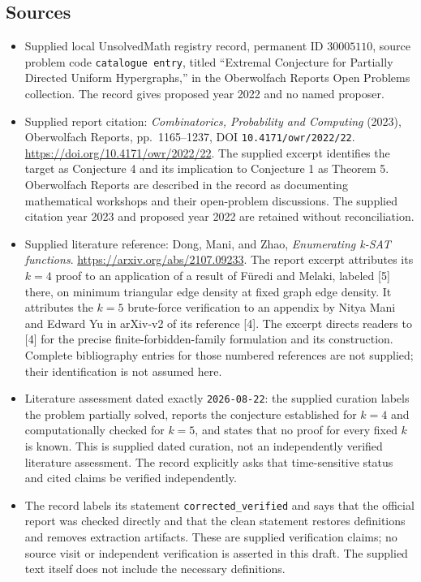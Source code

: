 \documentclass[11pt]{article}
\begin{document}
\subsection{Sources}
\begin{itemize}
\item Supplied local UnsolvedMath registry record, permanent ID \(30005110\), source problem code \texttt{catalogue entry}, titled ``Extremal Conjecture for Partially Directed Uniform Hypergraphs,'' in the Oberwolfach Reports Open Problems collection. The record gives proposed year 2022 and no named proposer.
\item Supplied report citation: \emph{Combinatorics, Probability and Computing} (2023), Oberwolfach Reports, pp.~1165--1237, DOI \texttt{10.4171/owr/2022/22}. \url{https://doi.org/10.4171/owr/2022/22}. The supplied excerpt identifies the target as Conjecture 4 and its implication to Conjecture 1 as Theorem 5. Oberwolfach Reports are described in the record as documenting mathematical workshops and their open-problem discussions. The supplied citation year 2023 and proposed year 2022 are retained without reconciliation.
\item Supplied literature reference: Dong, Mani, and Zhao, \emph{Enumerating k-SAT functions}. \url{https://arxiv.org/abs/2107.09233}. The report excerpt attributes its \(k=4\) proof to an application of a result of F\"uredi and Melaki, labeled [5] there, on minimum triangular edge density at fixed graph edge density. It attributes the \(k=5\) brute-force verification to an appendix by Nitya Mani and Edward Yu in arXiv-v2 of its reference [4]. The excerpt directs readers to [4] for the precise finite-forbidden-family formulation and its construction. Complete bibliography entries for those numbered references are not supplied; their identification is not assumed here.
\item Literature assessment dated exactly \texttt{2026-08-22}: the supplied curation labels the problem partially solved, reports the conjecture established for \(k=4\) and computationally checked for \(k=5\), and states that no proof for every fixed \(k\) is known. This is supplied dated curation, not an independently verified literature assessment. The record explicitly asks that time-sensitive status and cited claims be verified independently.
\item The record labels its statement \texttt{corrected\_verified} and says that the official report was checked directly and that the clean statement restores definitions and removes extraction artifacts. These are supplied verification claims; no source visit or independent verification is asserted in this draft. The supplied text itself does not include the necessary definitions.
\end{itemize}
\end{document}
